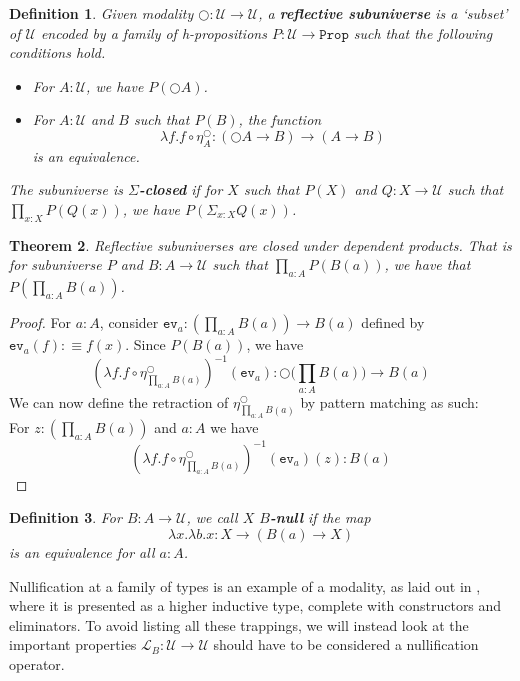 \documentclass[12pt]{report}
\newtheorem{thm}{Theorem}[section]
\newtheorem{defn}[thm]{Definition}
\begin{document}
\begin{defn}
Given modality $\bigcirc : \mathcal{U} \rightarrow \mathcal{U}$, a \textbf{reflective subuniverse} is a `subset' of $\mathcal{U}$ encoded by a family of h-propositions $P : \mathcal{U} \rightarrow \mathtt{Prop}$ such that the following conditions hold. 
\begin{itemize}
	\item For $A : \mathcal{U}$, we have $P(\bigcirc A)$.
	\item For $A : \mathcal{U}$ and $B$ such that $P(B)$, the function
	$$\lambda f.f \circ \eta_A^\bigcirc : (\bigcirc A \rightarrow B) \rightarrow (A \rightarrow B)$$
	is an equivalence.

\end{itemize}
The subuniverse is $\Sigma$\textbf{-closed} if for $X$ such that $P(X)$ and $Q : X \rightarrow \mathcal{U}$ such that $\prod_{x : X} P(Q(x))$, we have $P(\Sigma_{x : X} Q(x))$.
\end{defn}

\begin{thm}
Reflective subuniverses are closed under dependent products. 
That is for subuniverse $P$ and $B : A \rightarrow \mathcal{U}$ such that $\prod_{a : A}P(B(a))$, we have that $P(\prod_{a : A} B(a))$. 
\end{thm}

\begin{proof}
For $a : A$, consider $\mathtt{ev}_a: (\prod_{a: A}B(a)) \rightarrow B(a)$ defined by $\mathtt{ev}_a (f) : \equiv f(x)$. 
Since $P(B(a))$, we have 
$$(\lambda f.f \circ \eta_{\prod_{a: A}B(a)}^\bigcirc)^{-1} (\mathtt{ev}_a) : \bigcirc\big(\prod_{a: A}B(a)\big) \rightarrow B(a)$$
We can now define the retraction of $\eta^\bigcirc_{\prod_{a : A} B(a)}$ by pattern matching as such:\\
For $z: (\prod_{a: A}B(a))$ and $a : A$ we have 
$$(\lambda f.f \circ \eta_{\prod_{a: A}B(a)}^\bigcirc)^{-1} (\mathtt{ev}_a) (z) : B(a)$$

\end{proof}

\begin{defn}\label{Bnull}
For $B : A \rightarrow \mathcal{U}$, we call $X$ $B$\textbf{-null} if the map 
$$\lambda x. \lambda b.x : X \rightarrow (B(a) \rightarrow X)$$
is an equivalence for all $a : A$.

\end{defn}

Nullification at a family of types is an example of a modality, as laid out in \cite{1706.07526}, where it is presented as a higher inductive type, complete with constructors and eliminators. 
To avoid listing all these trappings, we will instead look at the important properties $\mathcal{L}_B : \mathcal{U} \rightarrow \mathcal{U}$ should have to be considered a nullification operator. 
\end{document}
